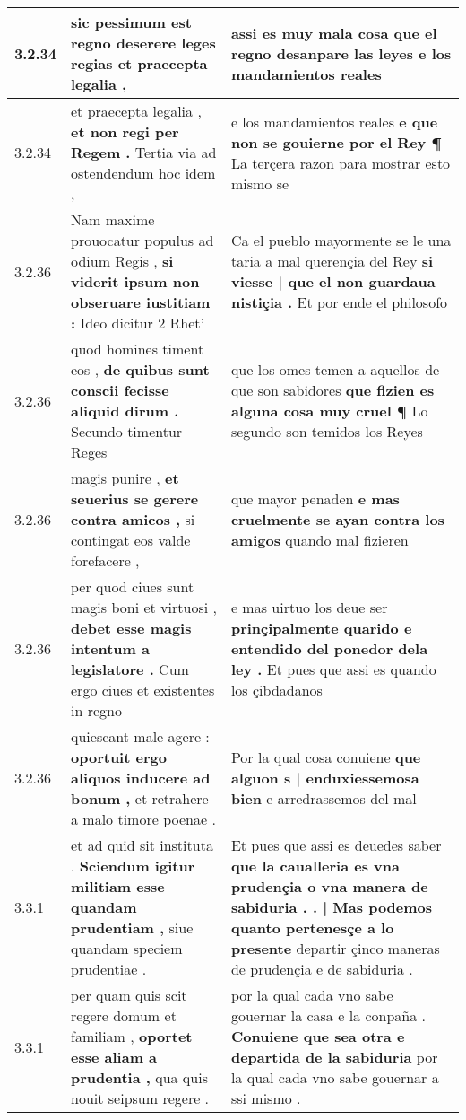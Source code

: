 \begin{tabular}{|p{1cm}|p{6.5cm}|p{6.5cm}|}
3.2.34 & sic pessimum est regno \textbf{ deserere leges regias } et praecepta legalia , & assi es muy mala cosa \textbf{ que el regno desanpare las leyes } e los mandamientos reales \\\hline
3.2.34 & et praecepta legalia , \textbf{ et non regi per Regem . } Tertia via ad ostendendum hoc idem , & e los mandamientos reales \textbf{ e que non se gouierne por el Rey ¶ } La terçera razon para mostrar esto mismo se \\\hline
3.2.36 & Nam maxime prouocatur populus ad odium Regis , \textbf{ si viderit ipsum non obseruare iustitiam : } Ideo dicitur 2 Rhet’ & Ca el pueblo mayormente se le una taria a mal querençia del Rey \textbf{ si viesse | que el non guardaua nistiçia . } Et por ende el philosofo \\\hline
3.2.36 & quod homines timent eos , \textbf{ de quibus sunt conscii fecisse aliquid dirum . } Secundo timentur Reges & que los omes temen a aquellos de que son sabidores \textbf{ que fizien es alguna cosa muy cruel ¶ } Lo segundo son temidos los Reyes \\\hline
3.2.36 & magis punire , \textbf{ et seuerius se gerere contra amicos , } si contingat eos valde forefacere , & que mayor penaden \textbf{ e mas cruelmente se ayan contra los amigos } quando mal fizieren \\\hline
3.2.36 & per quod ciues sunt magis boni et virtuosi , \textbf{ debet esse magis intentum a legislatore . } Cum ergo ciues et existentes in regno & e mas uirtuo los deue ser \textbf{ prinçipalmente quarido e entendido del ponedor dela ley . } Et pues que assi es quando los çibdadanos \\\hline
3.2.36 & quiescant male agere : \textbf{ oportuit ergo aliquos inducere ad bonum , } et retrahere a malo timore poenae . & Por la qual cosa conuiene \textbf{ que alguon s | enduxiessemosa bien } e arredrassemos del mal \\\hline
3.3.1 & et ad quid sit instituta . \textbf{ Sciendum igitur militiam esse quandam prudentiam , } siue quandam speciem prudentiae . & Et pues que assi es deuedes saber \textbf{ que la caualleria es vna prudençia o vna manera de sabiduria . . | Mas podemos quanto pertenesçe a lo presente } departir çinco maneras de prudençia e de sabiduria . \\\hline
3.3.1 & per quam quis scit regere domum et familiam , \textbf{ oportet esse aliam a prudentia , } qua quis nouit seipsum regere . & por la qual cada vno sabe gouernar la casa e la conpaña . \textbf{ Conuiene que sea otra e departida de la sabiduria } por la qual cada vno sabe gouernar a ssi mismo . \\\hline

\end{tabular}

